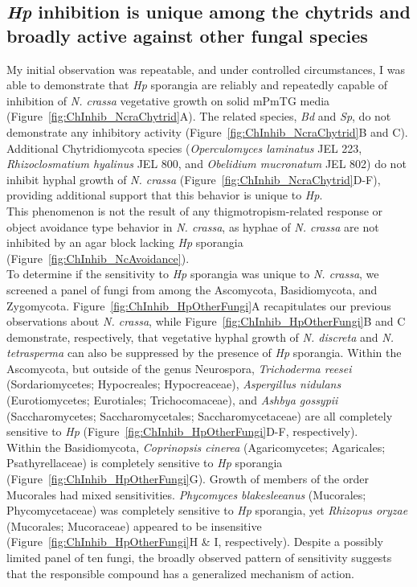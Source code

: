 \subsection*{\textit{Hp} inhibition is unique among the chytrids and broadly active against other fungal species}
My initial observation was repeatable, and under controlled circumstances, I was able to demonstrate that \textit{Hp} sporangia are reliably and repeatedly capable of inhibition of \textit{N. crassa} vegetative growth on solid mPmTG media (Figure~\ref{fig:ChInhib_NcraChytrid}A). The related species, \textit{Bd} and \textit{Sp}, do not demonstrate any inhibitory activity (Figure~\ref{fig:ChInhib_NcraChytrid}B and C). Additional Chytridiomycota species (\textit{Operculomyces laminatus} JEL 223, \textit{Rhizoclosmatium hyalinus} JEL 800, and \textit{Obelidium mucronatum} JEL 802) do not inhibit hyphal growth of \textit{N. crassa} (Figure~\ref{fig:ChInhib_NcraChytrid}D-F), providing additional support that this behavior is unique to \textit{Hp}. \\
\indent This phenomenon is not the result of any thigmotropism-related response or object avoidance type behavior in \textit{N. crassa}, as hyphae of \textit{N. crassa} are not inhibited by an agar block lacking \textit{Hp} sporangia (Figure~\ref{fig:ChInhib_NcAvoidance}).\\
\indent To determine if the sensitivity to \textit{Hp} sporangia was unique to \textit{N. crassa}, we screened a panel of fungi from among the Ascomycota, Basidiomycota, and Zygomycota. Figure~\ref{fig:ChInhib_HpOtherFungi}A recapitulates our previous observations about \textit{N. crassa}, while Figure~\ref{fig:ChInhib_HpOtherFungi}B and C demonstrate, respectively, that vegetative hyphal growth of \textit{N. discreta} and \textit{N. tetrasperma} can also be suppressed by the presence of \textit{Hp} sporangia.
\indent Within the Ascomycota, but outside of the genus Neurospora, \textit{Trichoderma reesei} (Sordariomycetes; Hypocreales; Hypocreaceae), \textit{Aspergillus nidulans} (Eurotiomycetes; Eurotiales; Trichocomaceae), and \textit{Ashbya gossypii} (Saccharomycetes; Saccharomycetales; Saccharomycetaceae) are all completely sensitive to \textit{Hp} (Figure~\ref{fig:ChInhib_HpOtherFungi}D-F, respectively). \\
\indent Within the Basidiomycota, \textit{Coprinopsis cinerea} (Agaricomycetes; Agaricales; Psathyrellaceae) is completely sensitive to \textit{Hp} sporangia (Figure~\ref{fig:ChInhib_HpOtherFungi}G). Growth of members of the order Mucorales had mixed sensitivities. \textit{Phycomyces blakesleeanus} (Mucorales; Phycomycetaceae) was completely sensitive to \textit{Hp} sporangia, yet \textit{Rhizopus oryzae} (Mucorales; Mucoraceae) appeared to be insensitive (Figure~\ref{fig:ChInhib_HpOtherFungi}H \& I, respectively). Despite a possibly limited panel of ten fungi, the broadly observed pattern of sensitivity suggests that the responsible compound has a generalized mechanism of action.\\
